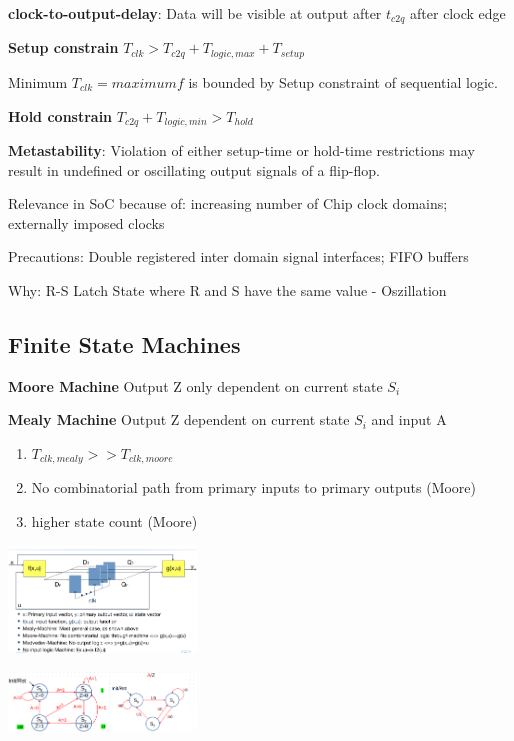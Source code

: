 \documentclass[english]{latex4ei/latex4ei_sheet}
\begin{document}
\textbf{clock-to-output-delay}: Data will be visible at output after $t_{c2q}$ after clock edge

\textbf{Setup constrain} $T_{clk} > T_{c2q} + T_{logic, max} + T_{setup}$

Minimum $T_{clk} = maximum f$ is bounded by Setup constraint of sequential logic. 

\textbf{Hold constrain} $T_{c2q} + T_{logic, min} > T_{hold}$

\textbf{Metastability}: Violation of either setup-time or hold-time restrictions may result in undefined or oscillating output signals of a flip-flop.

Relevance in SoC because of: increasing number of Chip clock domains; externally imposed clocks

Precautions: Double registered inter domain signal interfaces; FIFO buffers

Why: R-S Latch State where R and S have the same value - Oszillation


\subsection{Finite State Machines}

\textbf{Moore Machine} Output Z only dependent on current state $S_i$

\textbf{Mealy Machine} Output Z dependent on current state $S_i$ and input A

\begin{enumerate}
	\item $T_{clk, mealy} >> T_{clk, moore}$
	\item No combinatorial path from primary inputs to primary outputs (Moore)
	\item higher state count (Moore)
\end{enumerate}

\begin{center}
	\includegraphics[width = 5cm]{images/2. SoC Logic Design Recap/FSM.png}
\end{center}
\begin{center}
	\includegraphics[width = 5cm]{images/2. SoC Logic Design Recap/MooreMealy.png}
\end{center}
\end{document}
